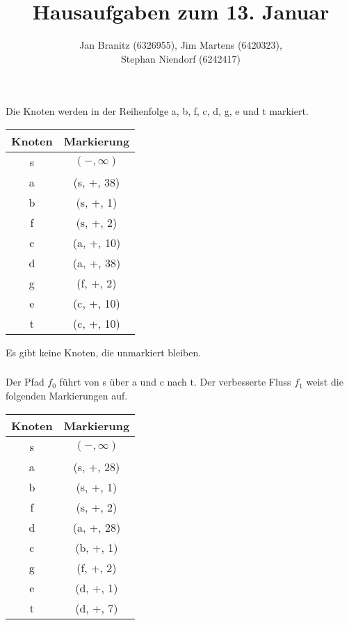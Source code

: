 \documentclass[10pt,a4paper,oneside,ngerman,numbers=noenddot]{scrartcl}
\begin{document}
\author{Jan Branitz (6326955), Jim Martens (6420323),\\
Stephan Niendorf (6242417)}
\title{Hausaufgaben zum 13. Januar}
\maketitle
\section{} %
	\subsection{} %
		\subsubsection{} %
			Die Knoten werden in der Reihenfolge a, b, f, c, d, g, e und t markiert.
			
			\begin{tabular}{c|c}
			Knoten & Markierung \\
			\hline
			s & $(-, \infty)$ \\
			a & (s, +, 38) \\
			b & (s, +, 1) \\
			f & (s, +, 2) \\
			c & (a, +, 10) \\
			d & (a, +, 38) \\
			g & (f, +, 2) \\
			e & (c, +, 10) \\
			t & (c, +, 10)
			\end{tabular}
			
			Es gibt keine Knoten, die unmarkiert bleiben.
		\subsubsection{} %
			Der Pfad $f_{0}$ führt von s über a und c nach t. Der verbesserte Fluss $f_{1}$ weist die folgenden Markierungen auf.
			
			\begin{tabular}{c|c}
			Knoten & Markierung \\
			\hline
			s & $(-, \infty)$ \\
			a & (s, +, 28) \\
			b & (s, +, 1) \\
			f & (s, +, 2) \\
			d & (a, +, 28) \\
			c & (b, +, 1) \\
			g & (f, +, 2) \\
			e & (d, +, 1) \\
			t & (d, +, 7)
			\end{tabular}
\end{document}
